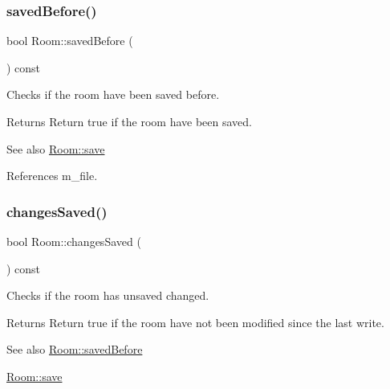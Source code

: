 \mbox{\label{classRoom_a05135b32eee12b1f69ce0a0497ce6f9e}} 
\subsubsection{\texorpdfstring{saved\+Before()}{savedBefore()}}
{\footnotesize\ttfamily bool Room\+::saved\+Before (\begin{DoxyParamCaption}{ }\end{DoxyParamCaption}) const}



Checks if the room have been saved before. 

\begin{DoxyReturn}{Returns}
Return true if the room have been saved. 
\end{DoxyReturn}
\begin{DoxySeeAlso}{See also}
\mbox{\hyperlink{classRoom_ad795aa64d503519ba0777e3f1d81e54c}{Room\+::save}} 
\end{DoxySeeAlso}


References m\+\_\+file.

\mbox{\label{classRoom_af51c094a0286a3312b05e2e8425d10f1}} 
\subsubsection{\texorpdfstring{changes\+Saved()}{changesSaved()}}
{\footnotesize\ttfamily bool Room\+::changes\+Saved (\begin{DoxyParamCaption}{ }\end{DoxyParamCaption}) const}



Checks if the room has unsaved changed. 

\begin{DoxyReturn}{Returns}
Return true if the room have not been modified since the last write.
\end{DoxyReturn}
\begin{DoxySeeAlso}{See also}
\mbox{\hyperlink{classRoom_a05135b32eee12b1f69ce0a0497ce6f9e}{Room\+::saved\+Before}} 

\mbox{\hyperlink{classRoom_ad795aa64d503519ba0777e3f1d81e54c}{Room\+::save}} 
\end{DoxySeeAlso}


